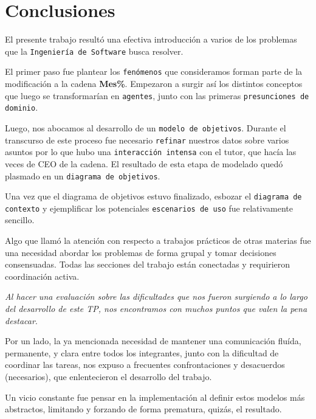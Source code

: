 
\section{Conclusiones}

El presente trabajo resultó una efectiva introducción a varios de los problemas
que la \texttt{Ingeniería de Software} busca resolver.

El primer paso fue plantear los \texttt{fenómenos} que consideramos forman parte
de la modificación a la cadena \textbf{Mes\%}. Empezaron a surgir así los
distintos conceptos que luego se transformarían en \texttt{agentes}, junto con
las primeras \texttt{presunciones de dominio}.

Luego, nos abocamos al desarrollo de un \texttt{modelo de objetivos}. Durante el
transcurso de este proceso fue necesario \texttt{refinar} nuestros datos sobre
varios asuntos por lo que hubo una \texttt{interacción intensa} con el tutor,
que hacía las veces de CEO de la cadena. El resultado de esta etapa de modelado
quedó plasmado en un \texttt{diagrama de objetivos}.

Una vez que el diagrama de objetivos estuvo finalizado, esbozar el
\texttt{diagrama de contexto} y ejemplificar los potenciales \texttt{escenarios
de uso} fue relativamente sencillo.

Algo que llamó la atención con respecto a trabajos prácticos de otras materias
fue una necesidad abordar los problemas de forma grupal y tomar decisiones
consensuadas. Todas las secciones del trabajo están conectadas y requirieron
coordinación activa.

\emph{Al hacer una evaluación sobre las dificultades que nos fueron surgiendo a
lo largo del desarrollo de este TP, nos encontramos con muchos puntos que valen
la pena destacar}.

Por un lado, la ya mencionada necesidad de mantener una comunicación fluída,
permanente, y clara entre todos los integrantes, junto con la dificultad de
coordinar las tareas, nos expuso a frecuentes confrontaciones y desacuerdos
(necesarios), que enlentecieron el desarrollo del trabajo.

Un vicio constante fue pensar en la implementación al definir estos modelos más
abstractos, limitando y forzando de forma prematura, quizás, el resultado.

